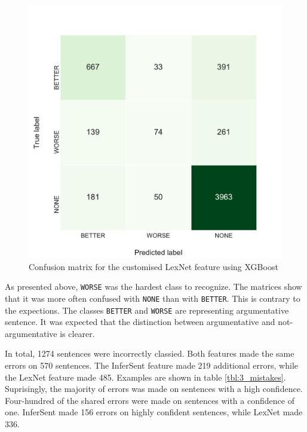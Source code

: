 \begin{figure}[h]
\begin{minipage}{.5\linewidth}
     \caption{Confusion matrix for the customised LexNet feature using XGBoost} 
       \label{fig:3_conf_uni}
 \centering
	\includegraphics[width=1\linewidth]{images/experiments/conf-middle_paths_unrestricted_16_False}
    \end{minipage} 
\end{figure}

As presented above, \texttt{WORSE} was the hardest class to recognize. The matrices show that it was more often confused with \texttt{NONE} than with \texttt{BETTER}. This is contrary to the expections. The classes  \texttt{BETTER} and \texttt{WORSE} are representing argumentative sentence. It was expected that the distinction between argumentative and not-argumentative is clearer. 

In total, 1274 sentences were incorrectly classied. Both features made the same errors on 570 sentences. The InferSent feature made 219 additional errors, while the LexNet feature made 485.  Examples are shown in table \ref{tbl:3_mistakes}. Suprisingly, the majority of errors was made on sentences with a high confidence. Four-hundred of the shared errors were made on sentences with a confidence of one. InferSent made 156 errors on highly confident sentences, while LexNet made 336.


